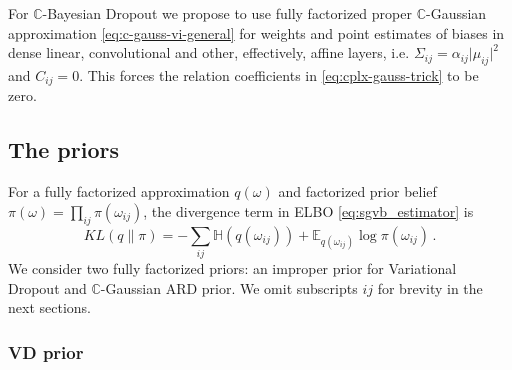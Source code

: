 \documentclass[a4paper,10pt,twocolumn]{article}
\newcommand{\cplx}{\mathbb{C}}
\begin{document}
For $\cplx$-Bayesian Dropout we propose to use fully factorized proper $\cplx$-Gaussian
approximation \eqref{eq:c-gauss-vi-general} for weights and point estimates of biases in
dense linear, convolutional and other, effectively, affine layers, i.e. $
  \Sigma_{ij} = \alpha_{ij} \lvert \mu_{ij} \rvert^2
$ and $C_{ij} = 0$. This forces the relation coefficients in \eqref{eq:cplx-gauss-trick}
to be zero.


\subsection{The priors} %
\label{sub:the_priors}

For a fully factorized approximation $q(\omega)$ and factorized prior belief $
  \pi(\omega) = \prod_{ij} \pi(\omega_{ij})
$, the divergence term in ELBO \eqref{eq:sgvb_estimator} is
\begin{equation}  \label{eq:elbo-general-kl-div}
  KL(q \| \pi)
    = - \sum_{ij}
        \mathbb{H}(q(\omega_{ij}))
        + \mathbb{E}_{q(\omega_{ij})} \log{\pi(\omega_{ij})}
    \,.
\end{equation}
We consider two fully factorized priors: an improper prior for Variational Dropout and
$\cplx$-Gaussian ARD prior. We omit subscripts ${ij}$ for brevity in the next sections.

\subsubsection{VD prior} %
\label{ssub:vd_prior}
\end{document}
